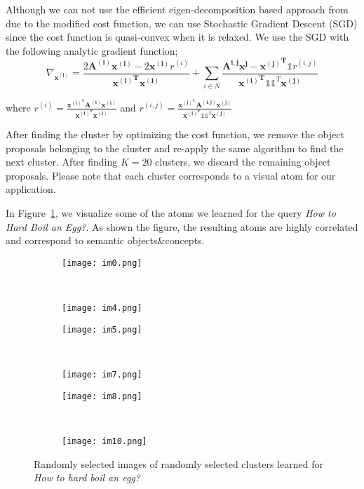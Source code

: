 Although we can not use the efficient eigen-decomposition based approach from \cite{scgp,scgp_eigen} due to the modified cost function, we can use Stochastic Gradient Descent (SGD) since the cost function is quasi-convex when it is relaxed. We use the SGD with the following analytic gradient function;
\begin{equation}
  \nabla_{\mathbf{x^{(i)}}} = \frac{2\mathbf{A^{(i)}} \mathbf{x^{(i)}} -2\mathbf{x^{(i)}} r^{(i)}}
  {\mathbf{{x^{(i)}}^T}\mathbf{x^{(i)}}}
+ \sum_{i \in N} \frac{\mathbf{A^{i,j}}\mathbf{x^{j}} - \mathbf{{x^{(j)}}^T} \mathds{1} r^{(i,j)}}{\mathbf{{x^{(i)}}^T} \mathds{1} \mathds{1}^T \mathbf{x^{(j)}} }
\end{equation}

where $r^{(i)}=\frac{\mathbf{x^{(i)^T}}\mathbf{A^{(i)}}\mathbf{x^{(i)}}}{\mathbf{x^{(i)^T}}\mathbf{x^{(i)}}}$ and $r^{(i,j)}=\frac{\mathbf{x^{(i)^T}}\mathbf{A^{(i,j)}}\mathbf{x^{(j)}}} {\mathbf{x^{(i)^T}}\mathds{1}\mathds{1}^T\mathbf{x^{(j)}}}$

After finding the cluster by optimizing the cost function, we remove the object proposals belonging to the cluster and re-apply the same algorithm to find the next cluster. After finding $K=20$ clusters, we discard the remaining object proposals. Please note that each cluster corresponds to a visual atom for our application.

In Figure~\ref{cvis}, we visualize some of the atoms we learned for the query \emph{How to Hard Boil an Egg?}. As shown the figure, the resulting atoms are highly correlated and correspond to semantic objects\&concepts.
\begin{figure}[ht]
  \begin{subfigure}[b]{0.23\textwidth}
\texttt{[image: im0.png]}
\end{subfigure}
~
\begin{subfigure}[b]{0.23\textwidth}
\texttt{[image: im4.png]}
\end{subfigure}
\begin{subfigure}[b]{0.23\textwidth}
\texttt{[image: im5.png]}
\end{subfigure}
~
\begin{subfigure}[b]{0.23\textwidth}
\texttt{[image: im7.png]}
\end{subfigure}

\begin{subfigure}[b]{0.23\textwidth}
\texttt{[image: im8.png]}
\end{subfigure}
~
\begin{subfigure}[b]{0.23\textwidth}
\texttt{[image: im10.png]}
\end{subfigure}
\caption{Randomly selected images of randomly selected clusters learned for \emph{How to hard boil an egg?}}
\label{cvis}
\end{figure}
